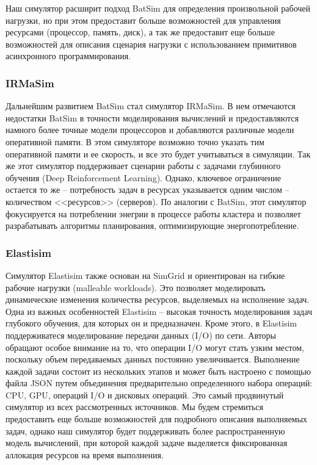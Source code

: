 Наш симулятор расширит подход BatSim для определения произвольной рабочей нагрузки, но при этом предоставит больше возможностей для управления ресурсами (процессор, память, диск), а так же предоставит еще больше возможностей для описания сценария нагрузки с использованием примитивов асинхронного программирования.

\subsubsection{IRMaSim}

Дальнейшим развитием BatSim стал симулятор IRMaSim\cite{irmasim-article}. В нем отмечаются недостатки BatSim в точности моделирования вычислений и предоставляются намного более точные модели процессоров и добавляются различные модели оперативной памяти. В этом симуляторе возможно точно указать тим оперативной памяти и ее скорость, и все это будет учитываться в симуляции. Так же этот симулятор поддерживает сценарии работы с задачами глубинного обучения (Deep Reinforcement Learning). Однако, ключевое ограничение остается то же -- потребность задач в ресурсах указывается одним числом -- количеством <<ресурсов>> (серверов). По аналогии с BatSim, этот симулятор фокусируется на потреблении энегрии в процессе работы кластера и позволяет разрабатывать алгоритмы планирования, оптимизирующие энергопотребление. 

\subsubsection{Elastisim}

Симулятор Elastisim\cite{elastisim-article} также основан на SimGrid и ориентирован на гибкие рабочие нагрузки (malleable workloads). Это позволяет моделировать динамические изменения количества ресурсов, выделяемых на исполнение задач. Одна из важных особенностей Elastisim -- высокая точность моделирования задач глубокого обучения, для которых он и предназначен. Кроме этого, в Elastisim поддерживатеся моделирование передачи данных (I/O) по сети. Авторы обращают особое внимание на то, что операции I/O могут стать узким местом, поскольку объем передаваемых данных постоянно увеличивается. Выполнение каждой задачи состоит из нескольких этапов и может быть настроено с помощью файла JSON путем объединения предварительно определенного набора операций: CPU, GPU, операций I/O и дисковых операций. Это самый продвинутый симулятор из всех рассмотренных источников. Мы будем стремиться предоставить еще больше возможностей для подробного описания выполняемых задач, однако наш симулятор будет поддерживать более распространенную модель вычислений, при которой каждой задаче выделяется фиксированная аллокация ресурсов на время выполнения.

